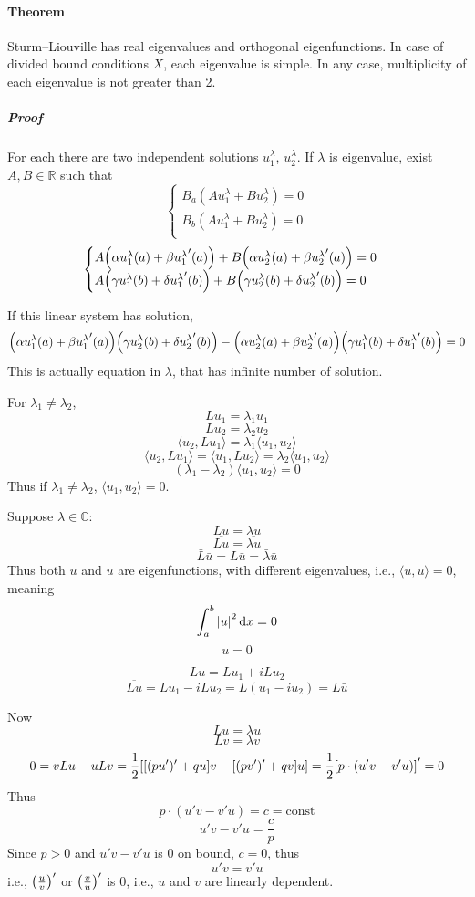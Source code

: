 \paragraph{Theorem} Sturm–Liouville has real eigenvalues and  orthogonal eigenfunctions. In case of divided bound conditions $X$, each eigenvalue is simple. In any case, multiplicity of each eigenvalue is not greater than 2.
\subparagraph{Proof}
For each there are two independent solutions $u_1^\lambda$, $u_2^\lambda$. If $\lambda$ is eigenvalue, exist $A,B \in \mathbb{R}$ such that
$$\begin{cases}
B_a(Au_1^\lambda + Bu_2^\lambda) = 0\\
B_b(Au_1^\lambda + Bu_2^\lambda) = 0\\
\end{cases}$$
$$\begin{cases}
A\qty(\alpha u_1^\lambda(a)+\beta{u^\lambda_1}'(a)) + B\qty(\alpha u_2^\lambda(a)+\beta{u^\lambda_2}'(a)) = 0\\
A\qty(\gamma u_1^\lambda(b)+\delta {u^\lambda_1}'(b)) + B\qty(\gamma u_2^\lambda(b)+\delta {u^\lambda_2}'(b)) = 0\\
\end{cases}$$

If this linear system has solution, 
$$\qty(\alpha u_1^\lambda(a)+\beta{u^\lambda_1}'(a))\qty(\gamma u_2^\lambda(b)+\delta {u^\lambda_2}'(b)) - \qty(\alpha u_2^\lambda(a)+\beta{u^\lambda_2}'(a))\qty(\gamma u_1^\lambda(b)+\delta {u^\lambda_1}'(b)) = 0$$
This is actually equation in $\lambda$, that has infinite number of solution.


For $\lambda_1 \neq \lambda_2$,
$$Lu_1 = \lambda_1 u_1$$
$$Lu_2 = \lambda_2 u_2$$
$$\langle u_2, Lu_1 \rangle = \lambda_1\langle u_1, u_2 \rangle $$
$$\langle u_2, Lu_1 \rangle  = \langle u_1, Lu_2 \rangle = \lambda_2\langle u_1, u_2 \rangle $$
$$(\lambda_1-\lambda_2)\langle u_1, u_2 \rangle = 0 $$
Thus if $\lambda_1 \neq \lambda_2$, $\langle u_1, u_2 \rangle = 0 $.

Suppose $\lambda \in \mathbb{C}$:
$$Lu = \lambda u$$
$$\overline{Lu} = \overline{\lambda u}$$
$$\bar{L} \bar{u} = L \bar{u} = \bar{\lambda}\bar{ u}$$
Thus both $u$ and $\bar{u}$ are eigenfunctions, with different eigenvalues, i.e., $\langle u, \bar{u} \rangle = 0 $, meaning 
$$\int_a^b \abs{u}^2 \dd{x} = 0$$
$$u=0$$

$$Lu = Lu_1 + iLu_2$$
$$\overline{Lu }= Lu_1 - iLu_2 = L(u_1-iu_2) = L\bar{u}$$

Now
$$Lu = \lambda u$$
$$Lv = \lambda v$$
$$0 = vLu - uLv = \frac{1}{2} \qty[\qty[(pu')'+qu]v - \qty[(pv')'+qv]u] = \frac{1}{2} \qty[p\cdot(u'v-v'u)]' = 0$$
Thus
$$p\cdot(u'v-v'u) = c = \text{const}$$
$$u'v-v'u = \frac{c}{p}$$
Since $p>0$ and $u'v-v'u$ is $0$ on bound, $c=0$, thus 
$$u'v = v'u $$
i.e.,
$\qty(\frac{u}{v})'$ or 
$\qty(\frac{v}{u})'$ is $0$, i.e., $u$ and $v$ are linearly dependent.

